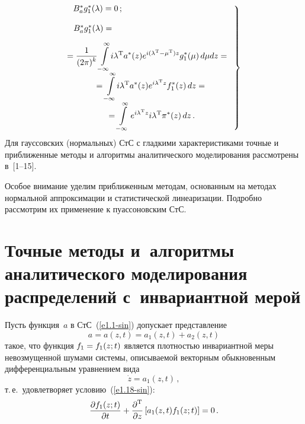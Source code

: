 \begin{multicols}{2}
\vspace*{-9pt}

\noindent
\begin{equation}
\left.
\begin{array}{c}
\hspace*{-45mm}B_a^* g_1^* (\la)=0\,;\\[12pt]
\hspace*{-48mm}B_a^* g_1^* (\la) = {}\\[10pt]
\hspace*{-3mm}{}=\fr{1}{(2\pi)^k} \iin\! i\la^{\mathrm{T}} a^* (z) e^{i(\la^{\mathrm{T}} -\mu^{\mathrm{T}})z} g_1^* (\mu)\, d\mu dz={}\\[10pt]
{}=\displaystyle\iin\! i\la^{\mathrm{T}} a^*(z) e^{i\la^{\mathrm{T}}z} f_1^* (z)\, dz = {}\\[10pt]
\displaystyle{}=
\iin e^{i\la^{\mathrm{T}} z} i\la^{\mathrm{T}} \pi^* (z)\, dz\,.
\end{array}
\right\}
\label{e1.21-sin}
\end{equation}
Для гауссовских (нормальных) СтС с гладкими характери\-стиками точные и приближенные 
методы  и алгоритмы аналитического моделирования рассмотрены в~[1--15]. 

Особое внимание 
уделим приближенным методам, основанным на методах нор\-маль\-ной аппроксимации и статистической 
линеаризации. Подробно рассмотрим их применение к пуассоновским СтС.



\section{Точные методы и~алгоритмы аналитического моделирования распределений 
с~инвариантной мерой}

Пусть функция~$a$ в СтС~(\ref{e1.1-sin}) допускает пред\-став\-ле\-ние
\begin{equation}
a= a(z,t) = a_1(z,t) +a_2 (z,t) \label{e2.1-sin}
\end{equation}
такое, что функция  $f_1\hm=f_1(z;t)$ является плот\-ностью инвариантной меры 
невозмущенной шумами системы, описываемой векторным обыкновенным дифференциальным 
уравнением вида
   \begin{equation}
   \dot z = a_1 (z,t)\,,\label{e2.2-sin}
   \end{equation}
т.\,е.\ удовлетворяет условию~(\ref{e1.18-sin}):
\begin{equation}
\displaystyle\frac{\displaystyle \partial f_1 (z;t)\mathstrut}{\displaystyle \partial t\mathstrut}+ \displaystyle\frac{\displaystyle \partial^{\mathrm{T}}\mathstrut}{\displaystyle \partial z\mathstrut} \left[ a_1 (z,t) f_1(z;t)\right] =0\,.
\label{e2.3-sin}
\end{equation}


\end{multicols}
